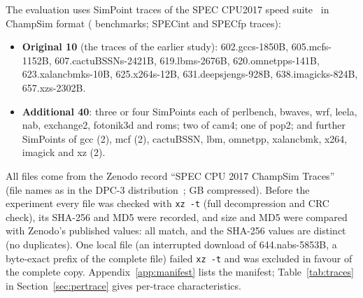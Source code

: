 \documentclass[11pt,a4paper]{article}
\newcommand{\code}[1]{\texttt{#1}}
\renewcommand{\_}{\textunderscore\allowbreak}
\begin{document}
The evaluation uses  SimPoint traces of the SPEC CPU2017 speed suite~\cite{speccpu2017} in ChampSim format ( benchmarks;  SPECint and  SPECfp traces):
\begin{itemize}
\item \textbf{Original 10} (the traces of the earlier study): 602.gcc\_s-1850B, 605.mcf\_s-1152B, 607.cactuBSSN\_s-2421B, 619.lbm\_s-2676B, 620.omnetpp\_s-141B, 623.xalancbmk\_s-10B, 625.x264\_s-12B, 631.deepsjeng\_s-928B, 638.imagick\_s-824B, 657.xz\_s-2302B.
\item \textbf{Additional 40}: three or four SimPoints each of perlbench, bwaves, wrf, leela, nab, exchange2, fotonik3d and roms; two of cam4; one of pop2; and further SimPoints of gcc (2), mcf (2), cactuBSSN, lbm, omnetpp, xalancbmk, x264, imagick and xz (2).
\end{itemize}
All files come from the Zenodo record ``SPEC CPU 2017 ChampSim Traces''~\cite{zenodo10960004} (file names as in the DPC-3 distribution~\cite{dpc3traces};  GB compressed). Before the experiment every file was checked with \code{xz -t} (full decompression and CRC check), its SHA-256 and MD5 were recorded, and size and MD5 were compared with Zenodo's published values: all  match, and the  SHA-256 values are distinct (no duplicates). One local file (an interrupted download of 644.nab\_s-5853B, a byte-exact prefix of the complete file) failed \code{xz -t} and was excluded in favour of the complete copy. Appendix~\ref{app:manifest} lists the manifest; Table~\ref{tab:traces} in Section~\ref{sec:pertrace} gives per-trace characteristics.
\end{document}
